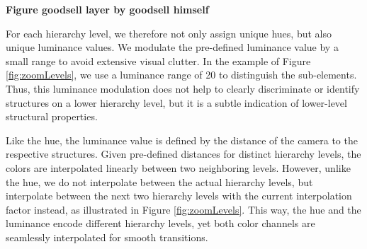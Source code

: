 \documentclass[review,journal]{vgtc}         %
\begin{document}
\textbf{Figure goodsell layer by goodsell himself}

For each hierarchy level, we therefore not only assign unique hues, but also unique luminance values. 
We modulate the pre-defined luminance value by a small range to avoid extensive visual clutter. 
In the example of Figure \ref{fig:zoomLevels}, we use a luminance range of 20 to distinguish the sub-elements. 
Thus, this luminance modulation does not help to clearly discriminate or identify structures on a lower hierarchy level, but it is a subtle indication of lower-level structural properties. 

Like the hue, the luminance value is defined by the distance of the camera to the respective structures. 
Given pre-defined distances for distinct hierarchy levels, the colors are interpolated linearly between two neighboring levels. 
However, unlike the hue, we do not interpolate between the actual hierarchy levels, but interpolate between the next two hierarchy levels with the current interpolation factor instead, as illustrated in Figure \ref{fig:zoomLevels}. 
This way, the hue and the luminance encode different hierarchy levels, yet both color channels are seamlessly interpolated for smooth transitions. 
 
\end{document}
